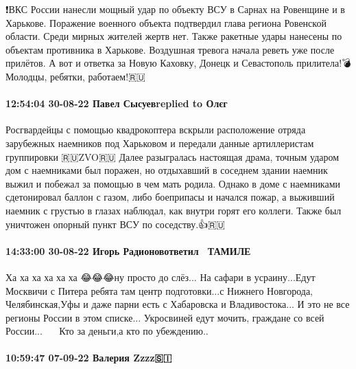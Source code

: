 ❗️ВКС России нанесли мощный удар по объекту ВСУ в Сарнах на Ровенщине и в Харькове.
Поражение военного объекта подтвердил глава региона Ровенской области.
Среди мирных жителей жертв нет.
Также ракетные удары нанесены по объектам противника в Харькове.
Воздушная тревога начала реветь уже после прилётов.
А вот и ответка за Новую Каховку, Донецк и Севастополь прилитела!💣 Молодцы, ребятки, работаем!🇷🇺💪🏻

\paragraph{12:54:04 30-08-22 Павел Сысуевreplied to Олєг}

Росгвардейцы с помощью квадрокоптера вскрыли расположение отряда зарубежных наемников под Харьковом и передали данные артиллеристам группировки 🇷🇺ZVO🇷🇺
Далее разыгралась настоящая драма, точным ударом дом с наемниками был поражен, но отдыхавший в соседнем здании наемник выжил и побежал за помощью в чем мать родила. Однако в доме с наемниками сдетонировал баллон с газом, либо боеприпасы и начался пожар, а выживший наемник с грустью в глазах наблюдал, как внутри горят его коллеги.
Также был уничтожен опорный пункт ВСУ по соседству.👍🇷🇺

\paragraph{14:33:00 30-08-22 Игорь Радионовответил 💙💛ТАМИЛЕ}

Ха ха ха ха ха ха 😂😂😂ну просто до слёз...
На сафари в усраину...Едут Москвичи с Питера ребята там центр подготовки...с Нижнего Новгорода, Челябинская,Уфы и даже парни есть с Хабаровска и Владивостока...
И это не все регионы России в этом списке...
Укросвиней едут мочить, граждане со всей России...🤣🤣🤣🤣🤣
Кто за деньги,а кто по убеждению..💪💪💪


\paragraph{10:59:47 07-09-22 Валерия Zzzz🇸🇮}


